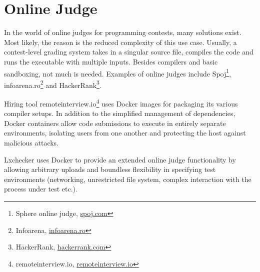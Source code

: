 \section{Online Judge}
\label{sec:judge}

In the world of online judges for programming contests, many solutions exist. Most likely, the reason is the reduced complexity of this use case. Usually, a contest-level grading system takes in a singular source file, compiles the code and runs the executable with multiple inputs. Besides compilers and basic sandboxing, not much is needed. Examples of online judges include Spoj\footnote{Sphere online judge, \url{spoj.com}}, infoarena.ro\footnote{Infoarena, \url{infoarena.ro}} and HackerRank\footnote{HackerRank, \url{hackerrank.com}}.

Hiring tool remoteinterview.io\footnote{remoteinterview.io, \url{remoteinterview.io}} uses Docker images for packaging its various compiler setups. In addition to the simplified management of dependencies, Docker containers allow code submissions to execute in entirely separate environments, isolating users from one another and protecting the host against malicious attacks.

Lxchecker uses Docker to provide an extended online judge functionality by allowing arbitrary uploads and boundless flexibility in specifying test environments (networking, unrestricted file system, complex interaction with the process under test etc.).

